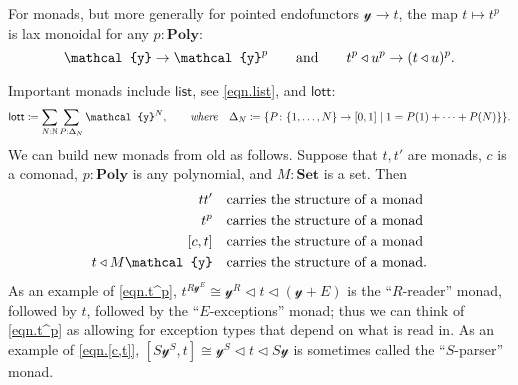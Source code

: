 \documentclass[11pt, one side, article]{memoir}
\theoremstyle{definition}
\theoremstyle{plain}
\newcommand{\Cat}[1]{\mathbf{#1}}%
\newcommand{\Fun}[1]{\mathsf{#1}}%
\newcommand{\tn}[1]{\textnormal{#1}}
\newcommand{\nn}{\mathbb{N}}
\newcommand{\smset}{\Cat{Set}}
\newcommand{\List}{\Fun{list}}
\newcommand{\lott}{\Fun{lott}}
\newcommand{\yon}{{\mathcal{y}}}
\newcommand{\poly}{\Cat{Poly}}
\newcommand{\0}{\textsf{0}}
\newcommand{\1}{\tn{\textsf{1}}}
\newcommand{\tri}{\mathbin{\triangleleft}}
\newcommand{\hh}[2][]{#1 \tn{#2} #1}
\newcommand{\qqand}{\hh[\qquad]{and}}
\newcommand{\hi}[4][]{#1 #2 \tn{\textit{#4}} #3}
\newcommand{\where}[1][,]{\hi[#1]{\qquad}{\quad}{where}}
\begin{document}
For monads, but more generally for pointed endofunctors $\yon\to t$, the map $t\mapsto t^p$ is lax monoidal for any $p:\poly$:
\begin{equation}
	\yon\to\yon^p
	\qqand
	t^p\tri u^p\to(t\tri u)^p.
\end{equation}

Important monads include $\List$, see \eqref{eqn.list}, and $\lott$:
\begin{equation}
	\lott\coloneqq\sum_{N:\nn}\sum_{P:\Delta_N}\yon^N
	\where
	\Delta_N\coloneqq\{P\colon\{1,\ldots,N\}\to[0,1]\mid1=P(1)+\cdots+P(N)\}\}.
\end{equation}
We can build new monads from old as follows. Suppose that $t,t'$ are monads, $c$ is a comonad, $p:\poly$ is any polynomial, and $M:\smset$ is a set. Then
\begin{align}
	tt'&\quad\tn{carries the structure of a monad}\\
	\label{eqn.t^p}
	t^p&\quad\tn{carries the structure of a monad}\\
	\label{eqn.[c,t]}
	[c,t]&\quad\tn{carries the structure of a monad}\\
	t\tri M\yon&\quad\tn{carries the structure of a monad}.
\end{align}
As an example of \eqref{eqn.t^p}, $t^{R\yon^E}\cong\yon^R\tri t\tri(\yon+E)$ is the ``$R$-reader'' monad, followed by $t$, followed by the ``$E$-exceptions'' monad; thus we can think of \eqref{eqn.t^p} as allowing for exception types that depend on what is read in. As an example of \eqref{eqn.[c,t]}, $[S\yon^S,t]\cong\yon^S\tri t\tri S\yon$ is sometimes called the ``$S$-parser'' monad.
\end{document}
